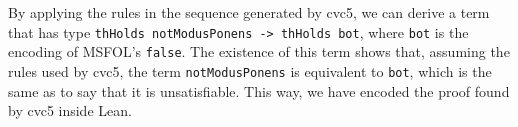 By applying the rules in the sequence generated by cvc5, we can derive a term
that has type \texttt{thHolds notModusPonens -> thHolds bot}, where \texttt{bot}
is the encoding of MSFOL's \texttt{false}.
%
The existence of this term shows that, assuming the rules used by cvc5, the term \texttt{notModusPonens} is equivalent to \texttt{bot}, which is the same as to say that it is unsatisfiable. This way, we have encoded the proof found by cvc5 inside Lean.
